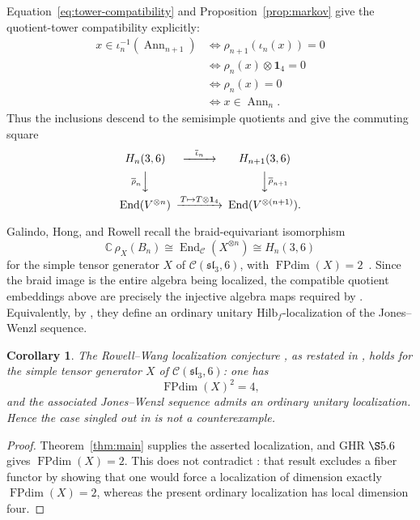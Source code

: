\documentclass[11pt]{article}
\newtheorem{corollary}[theorem]{Corollary}
\theoremstyle{remark}
\newcommand{\Id}{\mathbf 1}
\newcommand{\End}{\operatorname{End}}
\newcommand{\bbC}{\mathbb C}
\newcommand{\cC}{\mathcal C}
\begin{document}
Equation~\eqref{eq:tower-compatibility} and Proposition~\ref{prop:markov}
give the quotient-tower compatibility explicitly:
\[
\begin{aligned}
  x\in\iota_n^{-1}(\operatorname{Ann}_{n+1})
  &\Longleftrightarrow \rho_{n+1}(\iota_n(x))=0\\
  &\Longleftrightarrow \rho_n(x)\otimes\Id_4=0\\
  &\Longleftrightarrow \rho_n(x)=0\\
  &\Longleftrightarrow x\in\operatorname{Ann}_n.
\end{aligned}
\]
Thus the inclusions descend to the semisimple quotients and give the
commuting square
\[
\begin{CD}
  H_n(3,6) @>{\overline\iota_n}>> H_{n+1}(3,6)\\
  @V{\overline\rho_n}VV @VV{\overline\rho_{n+1}}V\\
  \End(V^{\otimes n}) @>{T\mapsto T\otimes\Id_4}>>
  \End(V^{\otimes(n+1)}).
\end{CD}
\]

Galindo, Hong, and Rowell recall the braid-equivariant isomorphism
\[
  \bbC\,\rho_X(B_n)
  \cong\End_{\cC}(X^{\otimes n})\cong H_n(3,6)
\]
for the simple tensor generator \(X\) of \(\cC(\mathfrak{sl}_3,6)\), with
\(\operatorname{FPdim}(X)=2\)~\cite[\S5.6]{GHR2013}.  Since the braid image is
the entire algebra being localized, the compatible quotient embeddings above
are precisely the injective algebra maps required by
\cite[Definition~1.3]{GHR2013}.  Equivalently, by
\cite[Proposition~4.12 and Definition~4.13]{GHR2013}, they define an ordinary
unitary \(\mathrm{Hilb}_f\)-localization of the Jones--Wenzl sequence.

\begin{corollary}\label{cor:not-counterexample}
The Rowell--Wang localization conjecture
\cite[Conjecture~3.1, p.~601]{RowellWang2012}, as restated in
\cite[Conjecture~1.5]{GHR2013}, holds for the simple tensor generator \(X\) of
\(\cC(\mathfrak{sl}_3,6)\): one has
\[
  \operatorname{FPdim}(X)^2=4,
\]
and the associated Jones--Wenzl sequence admits an ordinary unitary
localization.  Hence the case singled out in
\cite[Remark~6.2(2)]{GHR2013} is not a counterexample.
\end{corollary}

\begin{proof}
Theorem~\ref{thm:main} supplies the asserted localization, and GHR \(\S5.6\)
gives \(\operatorname{FPdim}(X)=2\).  This does not contradict
\cite[Theorem~5.27]{GHR2013}: that result excludes a fiber functor by showing
that one would force a localization of dimension exactly
\(\operatorname{FPdim}(X)=2\), whereas the present ordinary localization has
local dimension four.
\end{proof}
\end{document}
